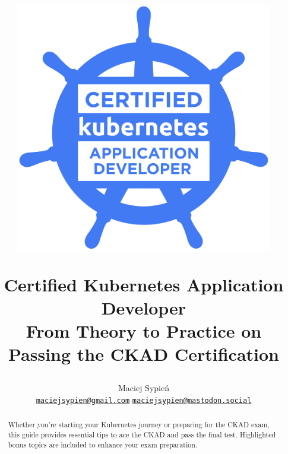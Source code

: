 \documentclass{article}
\title{
	\begin{figure}[ht]
		\centering
		\includegraphics[width=0.3\linewidth]{assets/img/logo_ckad.png}
		\label{fig:logo-ckad}
	\end{figure}
	
	Certified Kubernetes Application Developer\\
	{\large From Theory to Practice on Passing the CKAD Certification}
}
\author{Maciej Sypień \\
	\footnotesize{}
	\texttt{\href{mailto:maciejsypien@gmail.com}{maciejsypien@gmail.com}}
	\text{\textbar} \texttt{\href{https://mastodon.social/@maciejsypien}{maciejsypien@mastodon.social}}
}
\newcounter{tip}[section] \setcounter{tip}{0}
\begin{document}
\maketitle

\begin{abstract}
Whether you're starting your Kubernetes journey or preparing for the CKAD exam, this guide provides essential tips to ace the CKAD and pass the final test. Highlighted bonus topics are included to enhance your exam preparation.
\end{abstract}

\tableofcontents



\clearpage
\printbibliography[heading=bibintoc]
\end{document}
